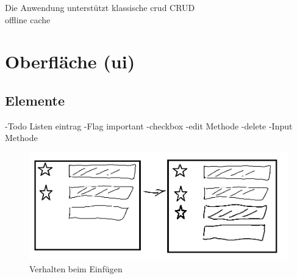 Die Anwendung unterstützt klassische \ac{crud}
CRUD\\
offline cache\\

\section{Oberfläche (\ac{ui})}

\subsection{Elemente}
-Todo Listen eintrag
    -Flag important
    -checkbox
    -edit Methode
    -delete
-Input Methode

\begin{figure}[h]
        \includegraphics[width=\linewidth]{img/sketch_insert.png}
        \centering
        \caption{Verhalten beim Einfügen}
        \label{fig:inserttodo}
\end{figure}

